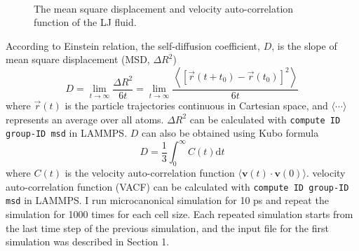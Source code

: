 \documentclass{article}
\newcommand{\diff}[1]{\mathrm{d} #1}
\newcommand{\ang}[1]{{\langle #1 \rangle}}
\begin{document}
\begin{figure}
    \centering
    \\
    \caption{The mean square displacement and velocity auto-correlation function of the LJ fluid.}
\end{figure}

According to Einstein relation, the self-diffusion coefficient, $D$, is the slope of mean square displacement (MSD, $\Delta R^2$)
\begin{equation}
    D = \lim _{t \rightarrow \infty} \frac{\Delta R^2}{6 t}=\lim _{t \rightarrow \infty} 
    \frac{\left \langle\left[\vec{r}\left(t+t_0\right)-\vec{r}\left(t_0\right)\right]^2\right \rangle}{6 t}
\end{equation}
where $\vec{r}(t)$ is the particle trajectories continuous in Cartesian space, and $\langle \cdots \rangle$ represents an average over all atoms. $\Delta R^2$ can be calculated with \verb|compute ID group-ID msd| in LAMMPS. $D$ can also be obtained using Kubo formula
\begin{equation}
    D = \frac{1}{3} \int_{0}^{\infty} C(t) \diff{t}
\end{equation}
where $C(t)$ is the velocity auto-correlation function $\ang{\mathbf{v}(t)\cdot \mathbf{v}(0)}$. velocity auto-correlation function (VACF) can be calculated with \verb|compute ID group-ID msd| in LAMMPS. I run microcanonical simulation for 10 ps and repeat the simulation for 1000 times for each cell size. Each repeated simulation starts from the last time step of the previous simulation, and the input file for the first simulation was described in Section 1.
\end{document}
